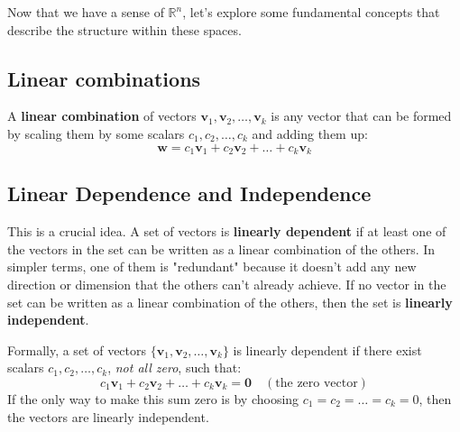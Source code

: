 \documentclass[11pt]{article}
\begin{document}
Now that we have a sense of $\mathbb{R}^n$, let's explore some fundamental concepts that describe the structure within these spaces.

\subsection{Linear combinations}
A \textbf{linear combination} of vectors $\mathbf{v}_1, \mathbf{v}_2, \dots, \mathbf{v}_k$ is any vector that can be formed by scaling them by some scalars $c_1, c_2, \dots, c_k$ and adding them up:
\[ \mathbf{w} = c_1\mathbf{v}_1 + c_2\mathbf{v}_2 + \dots + c_k\mathbf{v}_k \]

\subsection{Linear Dependence and Independence}
This is a crucial idea. A set of vectors is \textbf{linearly dependent} if at least one of the vectors in the set can be written as a linear combination of the others. In simpler terms, one of them is "redundant" because it doesn't add any new direction or dimension that the others can't already achieve. If no vector in the set can be written as a linear combination of the others, then the set is \textbf{linearly independent}.

Formally, a set of vectors $\{\mathbf{v}_1, \mathbf{v}_2, \dots, \mathbf{v}_k\}$ is linearly dependent if there exist scalars $c_1, c_2, \dots, c_k$, \textit{not all zero}, such that:
\[ c_1\mathbf{v}_1 + c_2\mathbf{v}_2 + \dots + c_k\mathbf{v}_k = \mathbf{0} \quad (\text{the zero vector}) \]
If the only way to make this sum zero is by choosing $c_1 = c_2 = \dots = c_k = 0$, then the vectors are linearly independent.
\end{document}

